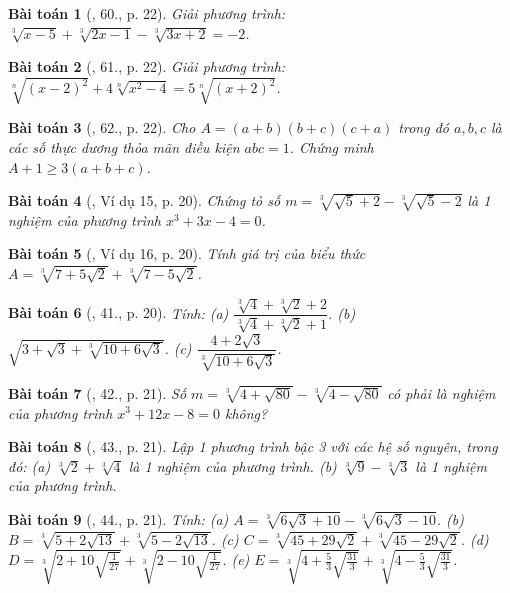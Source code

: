 \documentclass{article}
\newtheorem{baitoan}{Bài toán}
\begin{document}
\begin{baitoan}[\cite{Tuyen_Toan_9}, 60., p. 22]
	Giải phương trình: $\sqrt[3]{x - 5} + \sqrt[3]{2x - 1} - \sqrt[3]{3x + 2} = -2$.
\end{baitoan}

\begin{baitoan}[\cite{Tuyen_Toan_9}, 61., p. 22]
	Giải phương trình: $\sqrt[n]{(x - 2)^2} + 4\sqrt[n]{x^2 - 4} = 5\sqrt[n]{(x + 2)^2}$.
\end{baitoan}

\begin{baitoan}[\cite{Tuyen_Toan_9}, 62., p. 22]
	Cho $A = (a + b)(b + c)(c + a)$ trong đó $a,b,c$ là các số thực dương thỏa mãn điều kiện $abc = 1$. Chứng minh $A + 1\ge3(a + b + c)$.
\end{baitoan}


\begin{baitoan}[\cite{Binh_Toan_9_tap_1}, Ví dụ 15, p. 20]
	Chứng tỏ số $m = \sqrt[3]{\sqrt{5} + 2} - \sqrt[3]{\sqrt{5} - 2}$ là 1 nghiệm của phương trình $x^3 + 3x - 4 = 0$.
\end{baitoan}

\begin{baitoan}[\cite{Binh_Toan_9_tap_1}, Ví dụ 16, p. 20]
	Tính giá trị của biểu thức $A = \sqrt[3]{7 + 5\sqrt{2}} + \sqrt[3]{7 - 5\sqrt{2}}$.
\end{baitoan}

\begin{baitoan}[\cite{Binh_Toan_9_tap_1}, 41., p. 20]
	Tính: (a) $\dfrac{\sqrt[3]{4} + \sqrt[3]{2} + 2}{\sqrt[3]{4} + \sqrt[3]{2} + 1}$. (b) $\sqrt{3 + \sqrt{3} + \sqrt[3]{10 + 6\sqrt{3}}}$. (c) $\dfrac{4 + 2\sqrt{3}}{\sqrt[3]{10 + 6\sqrt{3}}}$.
\end{baitoan}

\begin{baitoan}[\cite{Binh_Toan_9_tap_1}, 42., p. 21]
	Số $m = \sqrt[3]{4 + \sqrt{80}} - \sqrt[3]{4 - \sqrt{80}}$ có phải là nghiệm của phương trình $x^3 + 12x - 8 = 0$ không?
\end{baitoan}

\begin{baitoan}[\cite{Binh_Toan_9_tap_1}, 43., p. 21]
	Lập 1 phương trình bậc 3 với các hệ số nguyên, trong đó: (a) $\sqrt[3]{2} + \sqrt[3]{4}$ là 1 nghiệm của phương trình. (b) $\sqrt[3]{9} - \sqrt[3]{3}$ là 1 nghiệm của phương trình.
\end{baitoan}

\begin{baitoan}[\cite{Binh_Toan_9_tap_1}, 44., p. 21]
	Tính: (a) $A = \sqrt[3]{6\sqrt{3} + 10} - \sqrt[3]{6\sqrt{3} - 10}$. (b) $B = \sqrt[3]{5 + 2\sqrt{13}} + \sqrt[3]{5 - 2\sqrt{13}}$. (c) $C = \sqrt[3]{45 + 29\sqrt{2}} + \sqrt[3]{45 - 29\sqrt{2}}$. (d) $D = \sqrt[3]{2 + 10\sqrt{\frac{1}{27}}} + \sqrt[3]{2 - 10\sqrt{\frac{1}{27}}}$. (e) $E = \sqrt[3]{4 + \frac{5}{3}\sqrt{\frac{31}{3}}} + \sqrt[3]{4 - \frac{5}{3}\sqrt{\frac{31}{3}}}$.
\end{baitoan}
\end{document}

